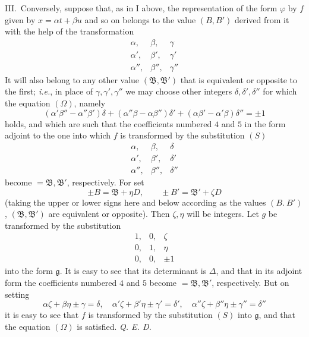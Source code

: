 III.\ Conversely, suppose that, as in I above, the representation of the
form $\varphi$ by $f$ given by $x=\alpha t+\beta u$ and so on belongs to the value
$(B,B')$ derived from it with the help of the transformation
\[
\begin{array}{ccc}
\alpha,&\beta,&\gamma\\
\alpha',&\beta',&\gamma'\\
\alpha'',&\beta'',&\gamma''
\end{array}
\]
It will also belong to any other value $(\mathfrak{B},\mathfrak{B}')$ that is equivalent or
opposite to the first; \textit{i.e.}, in place of
$\gamma,\gamma',\gamma''$ we may choose other integers $\delta,\delta',\delta''$ for which the equation
$(\Omega)$, namely
\[
(\alpha'\beta''-\alpha''\beta')\delta+
(\alpha''\beta-\alpha\beta'')\delta'+
(\alpha\beta'-\alpha'\beta)\delta''=\pm1
\]
holds, and which are such that the coefficients numbered $4$ and
$5$ in the form adjoint to the one into which $f$ is transformed
by the substitution $(S)$
\[
\begin{array}{ccc}
\alpha,&\beta,&\delta\\
\alpha',&\beta',&\delta'\\
\alpha'',&\beta'',&\delta''
\end{array}
\]
become $=\mathfrak{B},\mathfrak{B}'$, respectively. For set
\[
\pm B=\mathfrak{B}+\eta D,\qquad \pm B'=\mathfrak{B}'+\zeta D
\]
(taking the upper or lower signs here and below according as the values
$(B.\ B')$, $(\mathfrak{B},\mathfrak{B}')$ are equivalent or opposite).
Then $\zeta,\eta$ will be integers. Let $g$ be transformed by the substitution
\[
\begin{array}{ccc}
1,&0,&\zeta\\
0,&1,&\eta\\
0,&0,&\pm1
\end{array}
\]
into the form $\mathfrak{g}$. It is easy to see that its determinant is
$\Delta$, and that in its adjoint form the coefficients numbered
$4$ and $5$ become $=\mathfrak{B},\mathfrak{B}'$, respectively. But on setting
\[
\alpha\zeta+\beta\eta\pm\gamma=\delta,\quad
\alpha'\zeta+\beta'\eta\pm\gamma'=\delta',\quad
\alpha''\zeta+\beta''\eta\pm\gamma''=\delta''
\]
it is easy to see that $f$ is transformed by the substitution
$(S)$ into $\mathfrak{g}$, and that the equation $(\Omega)$ is satisfied.
\textit{Q. E. D.}

